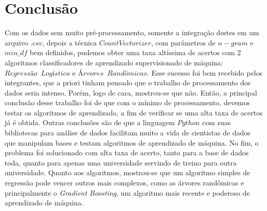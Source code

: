 \documentclass [12pt, a4paper] {article}
\begin{document}
\section{Conclusão}

Com os dados sem muito pré-processamento, somente a integração destes em um arquivo $.csv$, depois a técnica $CountVectorizer$, com parâmetros de $n-gram$ e $min\_df$ bem definidos, pudemos obter uma taxa altíssima de acertos com 2 algoritmos classificadores de aprendizado supervisionado de máquina: $Regressão \;\ Logística$ e $Árvores \;\ Randômicas$. Esse sucesso foi bem recebido pelos integrantes, que a priori tinham pensado que o trabalho de processamento dos dados seria intenso. Porém, logo de cara, mostrou-se que não. Então, a principal conclusão desse trabalho foi de que com o mínimo de processamento, devemos testar os algoritmos de aprendizado, a fim de verificar se uma alta taxa de acertos já é obtida. Outras conclusões são de que a linguagem $Python$ com suas bibliotecas para análise de dados facilitam muito a vida de cientistas de dados que manipulam bases e testam algoritmos de aprendizado de máquina. No fim, o problema foi solucionado com alta taxa de acerto, tanto para a base de dados toda, quanto para apenas uma universidade servindo de treino para outra universidade. Quanto aos algoritmos, mostrou-se que um algoritmo simples de regressão pode vencer outros mais complexos, como as árvores randômicas e principalmente o \textit{Gradient Boosting}, um algoritmo mais recente e poderoso de aprendizado de máquina.

\newpage
\end{document}
